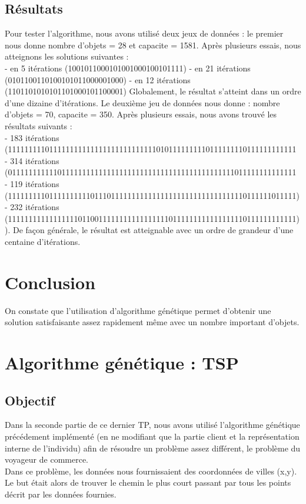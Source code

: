 \documentclass{article}
\begin{document}
\subsection{Résultats}
Pour tester l'algorithme, nous avons utilisé deux jeux de données : le premier nous donne nombre d'objets = 28 et capacite = 1581. Après plusieurs essais, nous atteignons les solutions suivantes : \\
- en 5 itérations (1001011000101001000100101111)
- en 21 itérations (0101100110100101011000001000)
- en 12 itérations (1101101010101101000101100001)
Globalement, le résultat s'atteint dans un ordre d'une dizaine d'itérations. Le deuxième jeu de données nous donne : nombre d'objets = 70, capacite = 350. Après plusieurs essais, nous avons trouvé les résultats suivants :\\
- 183 itérations (1111111110111111111111111111111111110101111111110111111110111111111111\\
- 314 itérations (0111111111110111111111111111111111111111111111111111111011111111111111\\
- 119 itérations (1111111110111111111101110111111111111111111111111111111110111111011111)\\
- 232 itérations (1111111111111111101100111111111111111110111111111111111110111111111111)\\
). De façon générale, le résultat est atteignable avec un ordre de grandeur d'une centaine d'itérations.
\section{Conclusion}
On constate que l'utilisation d'algorithme génétique permet d'obtenir une solution satisfaisante assez rapidement même avec un nombre important d'objets.
\section{Algorithme génétique : TSP}
\subsection{Objectif}
Dans la seconde partie de ce dernier TP, nous avons utilisé l'algorithme génétique précédement implémenté (en ne modifiant que la partie client et la représentation interne de l'individu) afin de résoudre un problème assez différent, le problème du voyageur de commerce.\\
Dans ce problème, les données nous fournissaient des coordonnées de villes (x,y). Le but était alors de trouver le chemin le plus court passant par tous les points décrit par les données fournies.
\end{document}

